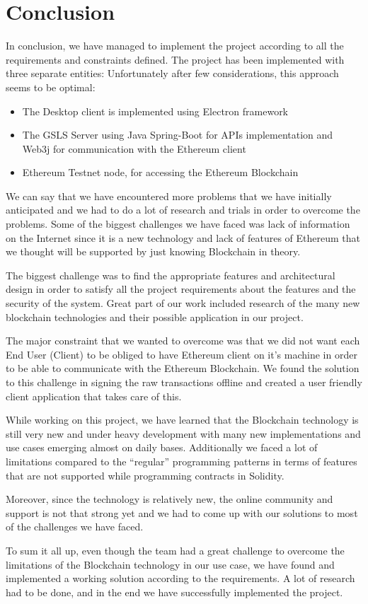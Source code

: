 \chapter{Conclusion}
\label{conclusion}

In conclusion, we have managed to implement the project according to all the requirements and constraints defined. The project has been implemented with three separate entities:
Unfortunately after few considerations, this approach seems to be optimal:
\begin{itemize}
	\item The Desktop client is implemented using Electron framework
	\item The GSLS Server using Java Spring-Boot for APIs implementation and Web3j for communication with the Ethereum client
	\item Ethereum Testnet node, for accessing the Ethereum Blockchain
\end{itemize}

We can say that we have encountered more problems that we have initially anticipated and we had to do a lot of research and trials in order to overcome the problems. Some of the biggest challenges we have faced was lack of information on the Internet since it is a new technology and lack of features of Ethereum that we thought will be supported by just knowing Blockchain in theory.

The biggest challenge was to find the appropriate features and architectural design in order to satisfy all the project requirements about the features and the security of the system. Great part of our work included research of the many new blockchain technologies and their possible application in our project.

The major constraint that we wanted to overcome was that we did not want each End User (Client) to be obliged to have Ethereum client on it’s machine in order to be able to communicate with the Ethereum Blockchain. We found the solution to this challenge in signing the raw transactions offline and created a user friendly client application that takes care of this.

While working on this project, we have learned that the Blockchain technology is still very new and under heavy development with many new implementations and use cases emerging almost on daily bases. Additionally we faced a lot of limitations compared to the “regular” programming patterns in terms of features that are not supported while programming contracts in Solidity.

Moreover, since the technology is relatively new, the online community and support is not that strong yet and we had to come up with our solutions to most of the challenges we have faced.

To sum it all up, even though the team had a great challenge to overcome the limitations of the Blockchain technology in  our use case, we have found and implemented a working solution according to the requirements. A lot of research had to be done, and in the end we have successfully implemented the project.

